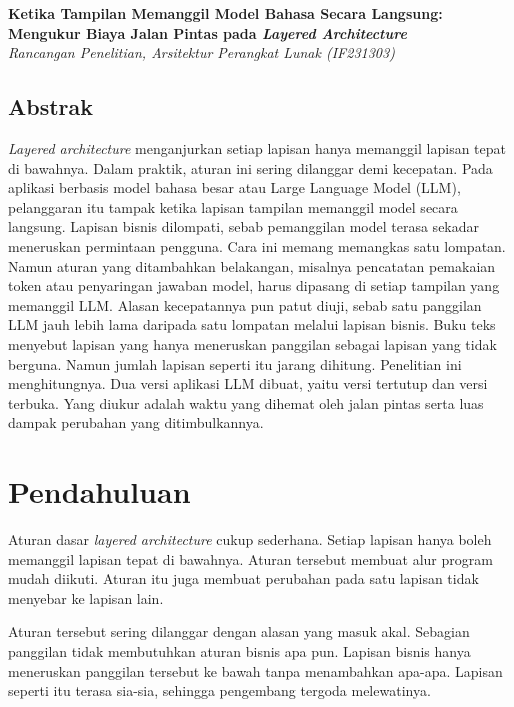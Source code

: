 \documentclass[11pt,a4paper]{article}
\begin{document}
\begin{center}
  {\LARGE\bfseries Ketika Tampilan Memanggil Model Bahasa Secara Langsung: Mengukur Biaya Jalan Pintas pada \textit{Layered Architecture}}\\[0.6em]
  {\small\itshape Rancangan Penelitian, Arsitektur Perangkat Lunak (IF231303)}
\end{center}

\vspace{1em}

\subsection*{Abstrak}

\textit{Layered architecture} menganjurkan setiap lapisan hanya memanggil lapisan tepat di bawahnya. Dalam praktik, aturan ini sering dilanggar demi kecepatan. Pada aplikasi berbasis model bahasa besar atau Large Language Model (LLM), pelanggaran itu tampak ketika lapisan tampilan memanggil model secara langsung. Lapisan bisnis dilompati, sebab pemanggilan model terasa sekadar meneruskan permintaan pengguna. Cara ini memang memangkas satu lompatan. Namun aturan yang ditambahkan belakangan, misalnya pencatatan pemakaian token atau penyaringan jawaban model, harus dipasang di setiap tampilan yang memanggil LLM. Alasan kecepatannya pun patut diuji, sebab satu panggilan LLM jauh lebih lama daripada satu lompatan melalui lapisan bisnis. Buku teks menyebut lapisan yang hanya meneruskan panggilan sebagai lapisan yang tidak berguna. Namun jumlah lapisan seperti itu jarang dihitung. Penelitian ini menghitungnya. Dua versi aplikasi LLM dibuat, yaitu versi tertutup dan versi terbuka. Yang diukur adalah waktu yang dihemat oleh jalan pintas serta luas dampak perubahan yang ditimbulkannya.

\section{Pendahuluan}

Aturan dasar \textit{layered architecture} cukup sederhana. Setiap lapisan hanya boleh memanggil lapisan tepat di bawahnya. Aturan tersebut membuat alur program mudah diikuti. Aturan itu juga membuat perubahan pada satu lapisan tidak menyebar ke lapisan lain.

Aturan tersebut sering dilanggar dengan alasan yang masuk akal. Sebagian panggilan tidak membutuhkan aturan bisnis apa pun. Lapisan bisnis hanya meneruskan panggilan tersebut ke bawah tanpa menambahkan apa-apa. Lapisan seperti itu terasa sia-sia, sehingga pengembang tergoda melewatinya.
\end{document}
